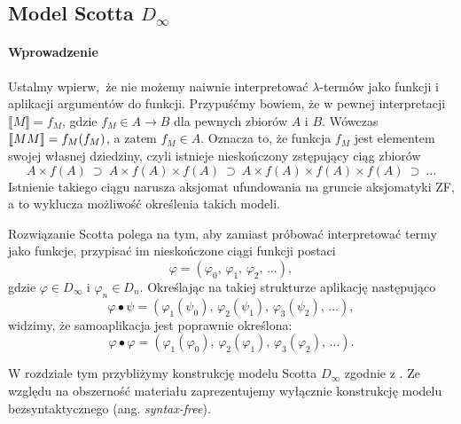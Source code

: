 \subsection{Model Scotta \(D_\infty\)}
\paragraph{Wprowadzenie}
Ustalmy wpierw, że nie możemy naiwnie interpretować \(\lambda\)-termów jako funkcji i aplikacji argumentów do funkcji. Przypuśćmy bowiem, że w pewnej interpretacji \(\llbracket M \rrbracket=f_M\), gdzie \(f_M \in A\to B\) dla pewnych zbiorów \(A\) i \(B\). Wówczas \(\llbracket M M\rrbracket=\nobreak f_M(f_M)\), a zatem \(f_M\in A\). Oznacza to, że funkcja \(f_M\) jest elementem swojej własnej dziedziny, czyli istnieje nieskończony zstępujący ciąg zbiorów \[A\times f(A)\ \supset\ A\times f(A)\times f(A)\ \supset\ A\times f(A)\times f(A)\times f(A)\ \supset\ \dots\] Istnienie takiego ciągu narusza aksjomat ufundowania na gruncie aksjomatyki ZF, a to wyklucza możliwość określenia takich modeli.

Rozwiązanie Scotta polega na tym, aby zamiast próbować interpretować termy jako funkcje, przypisać im nieskończone ciągi funkcji postaci 
\[
  \varphi = (\varphi_0,\,\varphi_1,\,\varphi_2,\,\dots),
\]
gdzie \(\varphi \in D_\infty\) i \(\varphi_n\in D_n\). Określając na takiej strukturze aplikację następująco
\[
  \varphi\bullet\psi = (\varphi_1(\psi_0),\,\varphi_2(\psi_1),\,\varphi_3(\psi_2),\,\dots),
\]
widzimy, że samoaplikacja jest poprawnie określona: 
\[
  \varphi\bullet\varphi = (\varphi_1(\varphi_0),\,\varphi_2(\varphi_1),\,\varphi_3(\varphi_2),\,\dots).
\]

W rozdziale tym przybliżymy konstrukcję modelu Scotta \(D_\infty\) zgodnie z \cite[Rozdział 16]{Hindley:2008:LCI:1388400}. Ze względu na obszerność materiału zaprezentujemy wyłącznie konstrukcję modelu bezsyntaktycznego (ang. \emph{syntax-free}). %

